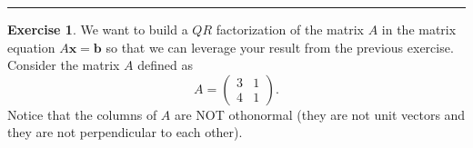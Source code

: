 \documentclass[
]{book}
\theoremstyle{definition}
\theoremstyle{definition}
\theoremstyle{definition}
\newtheorem{exercise}{Exercise}[chapter]
\theoremstyle{remark}
\begin{document}
\begin{center}\rule{0.5\linewidth}{0.5pt}\end{center}

\begin{exercise}
\protect\hypertarget{exr:unnamed-chunk-341}{}{\label{exr:unnamed-chunk-341} }We want to build a \(QR\) factorization of the matrix \(A\) in the matrix equation \(A \boldsymbol{x} = \boldsymbol{b}\) so that we can leverage your result from the previous exercise. Consider the matrix \(A\) defined as
\[ A = \begin{pmatrix} 3 & 1 \\ 4 & 1 \end{pmatrix}. \]
Notice that the columns of \(A\) are NOT othonormal (they are not unit vectors and they are not perpendicular to each other).


\end{exercise}
\end{document}
